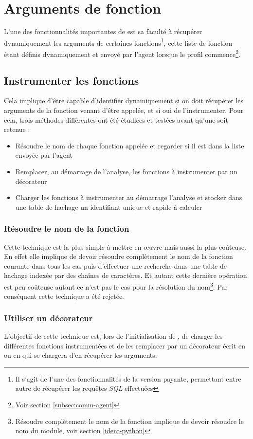   \section{Arguments de fonction}
  \label{sec:fnargs}
L'une des fonctionnalités importantes de \Blackfire est sa faculté à récupérer dynamiquement les arguments de certaines fonctions\footnote{Il s'agit de l'une des fonctionnalités de la version payante, permettant entre autre de récupérer les requêtes \emph{SQL} effectuées}, cette liste de fonction étant définis dynamiquement et envoyé par l'agent lorsque le profil commence\footnote{Voir section \vref{subsec:comm-agent}}.

\subsection{Instrumenter les fonctions}
Cela implique d'être capable d'identifier dynamiquement si on doit récupérer les arguments de la fonction venant d'être appelée, et si oui de l'instrumenter. Pour cela, trois méthodes différentes ont été étudiées et testées avant qu'une soit retenue : 
\begin{itemize}
\item Résoudre le nom de chaque fonction appelée et regarder si il est dans la liste envoyée par l'agent
\item Remplacer, au démarrage de l'analyse, les fonctions à instrumenter par un décorateur
\item Charger les fonctions à instrumenter au démarrage l'analyse et stocker dans une table de hachage un identifiant unique et rapide à calculer
\end{itemize}

\subsubsection*{Résoudre le nom de la fonction}
Cette technique est la plus simple à mettre en œuvre mais aussi la plus coûteuse. En effet elle implique de devoir résoudre complètement le nom de la fonction courante dans tous les cas puis d'effectuer une recherche dans une table de hachage indexée par des chaînes de caractères. Et autant cette dernière opération est peu coûteuse autant ce n'est pas le cas pour la résolution du nom\footnote{Résoudre complètement le nom de la fonction implique de devoir résoudre le nom du module, voir section \vref{ident-python}}. Par conséquent cette technique a été rejetée.

\subsubsection*{Utiliser un décorateur}
L'objectif de cette technique est, lors de l'initialisation de \Blackfire, de charger les différentes fonctions instrumentées et de les remplacer par un décorateur écrit en \C ou en \Python qui se chargera d'en récupérer les arguments.

